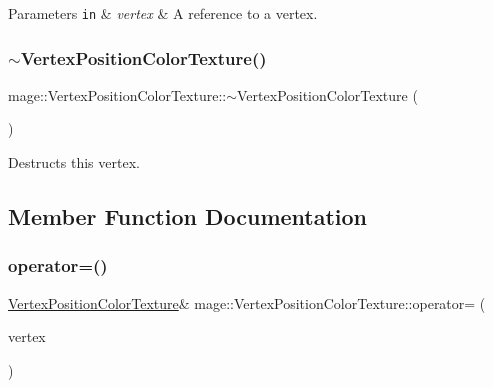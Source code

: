 \begin{DoxyParams}[1]{Parameters}
\mbox{\tt in}  & {\em vertex} & A reference to a vertex. \\
\hline
\end{DoxyParams}
\hypertarget{structmage_1_1_vertex_position_color_texture_a07cc697a88ef1a75ef64aadac9945c11}{}\label{structmage_1_1_vertex_position_color_texture_a07cc697a88ef1a75ef64aadac9945c11} 
\subsubsection{\texorpdfstring{$\sim$\+Vertex\+Position\+Color\+Texture()}{~VertexPositionColorTexture()}}
{\footnotesize\ttfamily mage\+::\+Vertex\+Position\+Color\+Texture\+::$\sim$\+Vertex\+Position\+Color\+Texture (\begin{DoxyParamCaption}{ }\end{DoxyParamCaption})\hspace{0.3cm}{\ttfamily [default]}}

Destructs this vertex. 

\subsection{Member Function Documentation}
\hypertarget{structmage_1_1_vertex_position_color_texture_a6b8d5ebc779ddf9f6e68dc83cb30fe0c}{}\label{structmage_1_1_vertex_position_color_texture_a6b8d5ebc779ddf9f6e68dc83cb30fe0c} 
\subsubsection{\texorpdfstring{operator=()}{operator=()}\hspace{0.1cm}{\footnotesize\ttfamily [1/2]}}
{\footnotesize\ttfamily \hyperlink{structmage_1_1_vertex_position_color_texture}{Vertex\+Position\+Color\+Texture}\& mage\+::\+Vertex\+Position\+Color\+Texture\+::operator= (\begin{DoxyParamCaption}\item[{const \hyperlink{structmage_1_1_vertex_position_color_texture}{Vertex\+Position\+Color\+Texture} \&}]{vertex }\end{DoxyParamCaption})\hspace{0.3cm}{\ttfamily [default]}}

